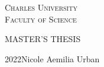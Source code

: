 \documentclass [a4paper,12pt]{report}
\def \BookName {MASTER'S THESIS}
\def \AutorDP {Nicole Aemilia Urban}
\def \Year {2022}
\def \CUNI {Charles University}
\def \FSS {Faculty of Science}
\begin{document}
\pagestyle{empty}

    \begin{center}
    {\LARGE \textsc{\CUNI}}\\[2ex]
    {\LARGE \textsc{\FSS}}\\
 	 {\Large \textsc{\IES}}

		\vspace{8.47cm}
		
    {\Huge \BookName \\[4ex]

    }

    \vfill

    {\Large \Year \hfill \AutorDP}\\[6ex]

    \newpage
    \end{center}
\end{document}
